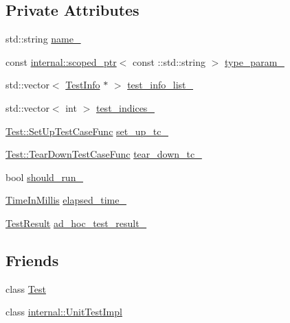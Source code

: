 \subsection*{Private Attributes}
\begin{DoxyCompactItemize}
\item 
std\+::string \mbox{\hyperlink{classtesting_1_1_test_case_a6c16e28e7555dc6a158415b3bfc4f833}{name\+\_\+}}
\item 
const \mbox{\hyperlink{classtesting_1_1internal_1_1scoped__ptr}{internal\+::scoped\+\_\+ptr}}$<$ const \+::std\+::string $>$ \mbox{\hyperlink{classtesting_1_1_test_case_a4952403fca9baa20275b3fcdc28977db}{type\+\_\+param\+\_\+}}
\item 
std\+::vector$<$ \mbox{\hyperlink{classtesting_1_1_test_info}{Test\+Info}} $\ast$ $>$ \mbox{\hyperlink{classtesting_1_1_test_case_adce272a48399dd67a7bdd14fa7e99b80}{test\+\_\+info\+\_\+list\+\_\+}}
\item 
std\+::vector$<$ int $>$ \mbox{\hyperlink{classtesting_1_1_test_case_a6bb04b98c46a3eecf7a4e6f62593a827}{test\+\_\+indices\+\_\+}}
\item 
\mbox{\hyperlink{classtesting_1_1_test_a5f2a051d1d99c9b784c666c586186cf9}{Test\+::\+Set\+Up\+Test\+Case\+Func}} \mbox{\hyperlink{classtesting_1_1_test_case_a272e1bcea07b9654ffc5470e64579d35}{set\+\_\+up\+\_\+tc\+\_\+}}
\item 
\mbox{\hyperlink{classtesting_1_1_test_aa0f532e93b9f3500144c53f31466976c}{Test\+::\+Tear\+Down\+Test\+Case\+Func}} \mbox{\hyperlink{classtesting_1_1_test_case_a0ceb56d10b167cfc51a286a7b9b2fbbc}{tear\+\_\+down\+\_\+tc\+\_\+}}
\item 
bool \mbox{\hyperlink{classtesting_1_1_test_case_a2f98fefe1f624c879e0320882c561d85}{should\+\_\+run\+\_\+}}
\item 
\mbox{\hyperlink{namespacetesting_a992de1d091ce660f451d1e8b3ce30fd6}{Time\+In\+Millis}} \mbox{\hyperlink{classtesting_1_1_test_case_a0379c376d8832e6fd1d5d9c7c3c32759}{elapsed\+\_\+time\+\_\+}}
\item 
\mbox{\hyperlink{classtesting_1_1_test_result}{Test\+Result}} \mbox{\hyperlink{classtesting_1_1_test_case_a4aec85d3398a4a0161f1cde69c07aadc}{ad\+\_\+hoc\+\_\+test\+\_\+result\+\_\+}}
\end{DoxyCompactItemize}
\subsection*{Friends}
\begin{DoxyCompactItemize}
\item 
class \mbox{\hyperlink{classtesting_1_1_test_case_a5b78b1c2e1fa07ffed92da365593eaa4}{Test}}
\item 
class \mbox{\hyperlink{classtesting_1_1_test_case_acc0a5e7573fd6ae7ad1878613bb86853}{internal\+::\+Unit\+Test\+Impl}}
\end{DoxyCompactItemize}


